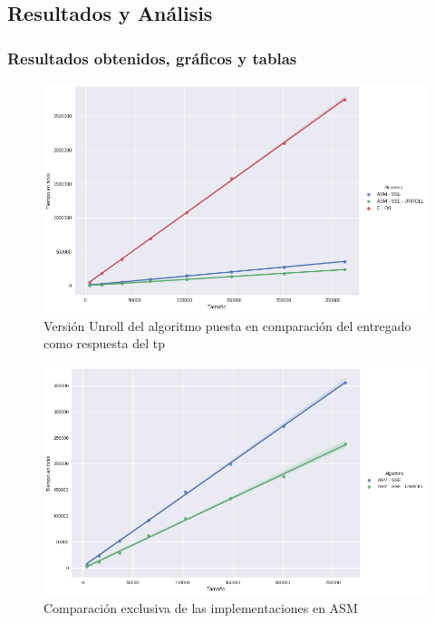 \subsection{Resultados y Análisis}
\subsubsection*{Resultados obtenidos, gráficos y tablas}
\begin{figure}[H]
\centering
\includegraphics[scale=0.5]{img/fourCombine_UnrollvsNormal.png}
\caption{Versión Unroll del algoritmo puesta en comparación del entregado como respuesta del tp}
\label{sec:unroolvsnormal}
\end{figure}

\begin{figure}[H]
\centering
\includegraphics[scale=0.5]{img/fourCombine_UnrollvsNormal_asmOnly.png}
\caption{Comparación exclusiva de las implementaciones en ASM}
\label{sec:unroolvsnormal_asmOnly}
\end{figure}

